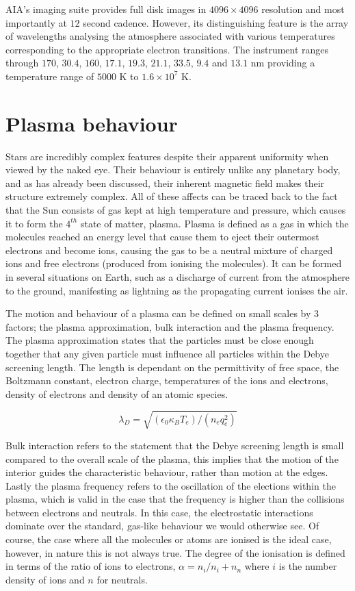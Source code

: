 AIA's imaging suite provides full disk images in $4096 \times 4096$ resolution and most importantly at $12$ second cadence.
However, its distinguishing feature is the array of wavelengths analysing the atmosphere \cite{AIAspec} associated with various temperatures corresponding to the appropriate electron transitions.
The instrument ranges through $170$, $30.4$, $160$, $17.1$, $19.3$, $21.1$, $33.5$, $9.4$ and $13.1$ nm providing a temperature range of $5000$ K to $1.6 \times 10^7$ K.




\section{Plasma behaviour}

Stars are incredibly complex features despite their apparent uniformity when viewed by the naked eye.
Their behaviour is entirely unlike any planetary body, and as has already been discussed, their inherent magnetic field makes their structure extremely complex.
All of these affects can be traced back to the fact that the Sun consists of gas kept at high temperature and pressure, which causes it to form the $4^{th}$ state of matter, plasma.
Plasma is defined as a gas in which the molecules reached an energy level that cause them to eject their outermost electrons and become ions, causing the gas to be a neutral mixture of charged ions and free electrons (produced from ionising the molecules).
It can be formed in several situations on Earth, such as a discharge of current from the atmosphere to the ground, manifesting as lightning as the propagating current ionises the air.

The motion and behaviour of a plasma can be defined on small scales by 3 factors; the plasma approximation, bulk interaction and the plasma frequency.
The plasma approximation states that the particles must be close enough together that any given particle must influence all particles within the Debye screening length.
The length is dependant on the permittivity of free space, the Boltzmann constant, electron charge, temperatures of the ions and electrons, density of electrons and density of an atomic species.

\begin{equation}
	\lambda_D = \sqrt{(\epsilon_0\kappa_BT_e)/(n_eq_e^2)}
\end{equation}

Bulk interaction refers to the statement that the Debye screening length is small compared to the overall scale of the plasma, this implies that the motion of the interior guides the characteristic behaviour, rather than motion at the edges.
Lastly the plasma frequency refers to the oscillation of the elections within the plasma, which is valid in the case that the frequency is higher than the collisions between electrons and neutrals.
In this case, the electrostatic interactions dominate over the standard, gas-like behaviour we would otherwise see.
Of course, the case where all the molecules or atoms are ionised is the ideal case, however, in nature this is not always true.
The degree of the ionisation is defined in terms of the ratio of ions to electrons, $\alpha = n_i/{n_i + n_n}$ where $i$ is the number density of ions and $n$ for neutrals.

